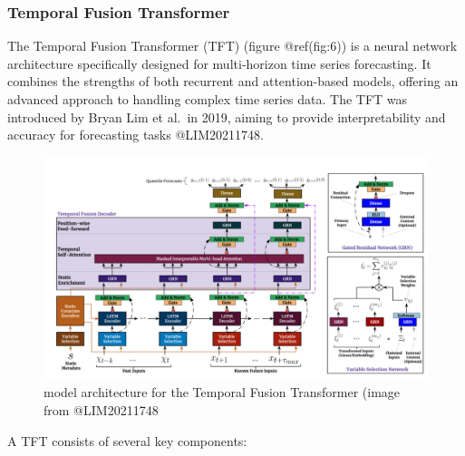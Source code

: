 \documentclass[
]{article}
\begin{document}
\hypertarget{temporal-fusion-transformer}{%
\subsubsection{Temporal Fusion
Transformer}\label{temporal-fusion-transformer}}

The Temporal Fusion Transformer (TFT) (figure @ref(fig:6)) is a neural
network architecture specifically designed for multi-horizon time series
forecasting. It combines the strengths of both recurrent and
attention-based models, offering an advanced approach to handling
complex time series data. The TFT was introduced by Bryan Lim et al.~in
2019, aiming to provide interpretability and accuracy for forecasting
tasks @LIM20211748.

\begin{figure}

{\centering \includegraphics[width=500px]{work/07-hydroLSTM/images/TFT} 

}

\caption{model architecture for the Temporal Fusion Transformer (image from @LIM20211748}\label{fig:6}
\end{figure}

A TFT consists of several key components:
\end{document}
